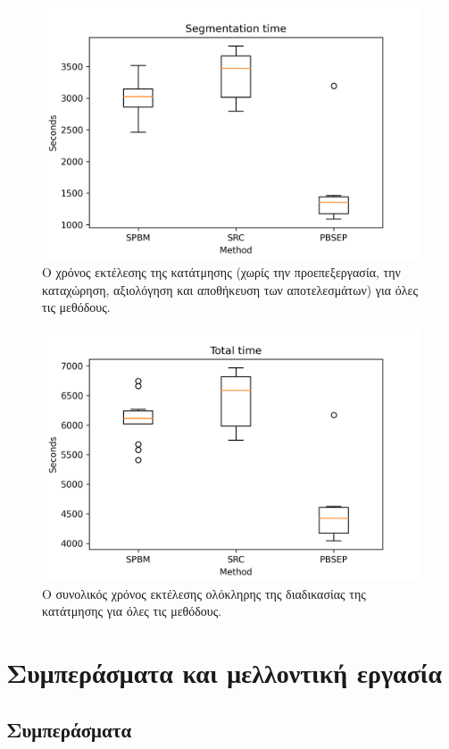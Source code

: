 \documentclass[a4paper,12pt]{article}
\begin{document}
\begin{figure}[H]
    \centering
    \includegraphics[width=0.85\linewidth]{Segmentation_time_plot.png}
    \caption{Ο χρόνος εκτέλεσης της κατάτμησης (χωρίς την προεπεξεργασία, την
             καταχώρηση, αξιολόγηση και αποθήκευση των αποτελεσμάτων) για όλες
             τις μεθόδους.} 
    \label{fig:segmentation_time:1}
\end{figure}

\begin{figure}[H]
    \centering
    \includegraphics[width=0.85\linewidth]{Total_time_plot.png}
    \caption{Ο συνολικός χρόνος εκτέλεσης ολόκληρης της διαδικασίας της
             κατάτμησης για όλες τις μεθόδους.} 
    \label{fig:total_time:1}
\end{figure}


\section{Συμπεράσματα και μελλοντική εργασία}

\subsection{Συμπεράσματα} \label{conclusions}
\end{document}
